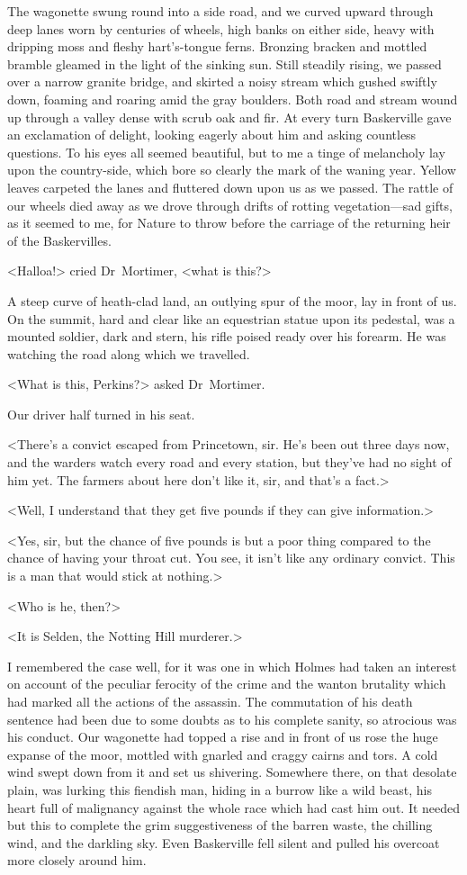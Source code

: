 The wagonette swung round into a side road, and we curved upward through deep lanes worn by centuries of wheels, high banks on either side, heavy with dripping moss and fleshy hart's-tongue ferns. Bronzing bracken and mottled bramble gleamed in the light of the sinking sun. Still steadily rising, we passed over a narrow granite bridge, and skirted a noisy stream which gushed swiftly down, foaming and roaring amid the gray boulders. Both road and stream wound up through a valley dense with scrub oak and fir. At every turn Baskerville gave an exclamation of delight, looking eagerly about him and asking countless questions. To his eyes all seemed beautiful, but to me a tinge of melancholy lay upon the country-side, which bore so clearly the mark of the waning year. Yellow leaves carpeted the lanes and fluttered down upon us as we passed. The rattle of our wheels died away as we drove through drifts of rotting vegetation—sad gifts, as it seemed to me, for Nature to throw before the carriage of the returning heir of the Baskervilles.

<Halloa!> cried Dr~Mortimer, <what is this?>

A steep curve of heath-clad land, an outlying spur of the moor, lay in front of us. On the summit, hard and clear like an equestrian statue upon its pedestal, was a mounted soldier, dark and stern, his rifle poised ready over his forearm. He was watching the road along which we travelled.

<What is this, Perkins?> asked Dr~Mortimer.

Our driver half turned in his seat.

<There's a convict escaped from Princetown, sir. He's been out three days now, and the warders watch every road and every station, but they've had no sight of him yet. The farmers about here don't like it, sir, and that's a fact.>

<Well, I understand that they get five pounds if they can give information.>

<Yes, sir, but the chance of five pounds is but a poor thing compared to the chance of having your throat cut. You see, it isn't like any ordinary convict. This is a man that would stick at nothing.>

<Who is he, then?>

<It is Selden, the Notting Hill murderer.>

I remembered the case well, for it was one in which Holmes had taken an interest on account of the peculiar ferocity of the crime and the wanton brutality which had marked all the actions of the assassin. The commutation of his death sentence had been due to some doubts as to his complete sanity, so atrocious was his conduct. Our wagonette had topped a rise and in front of us rose the huge expanse of the moor, mottled with gnarled and craggy cairns and tors. A cold wind swept down from it and set us shivering. Somewhere there, on that desolate plain, was lurking this fiendish man, hiding in a burrow like a wild beast, his heart full of malignancy against the whole race which had cast him out. It needed but this to complete the grim suggestiveness of the barren waste, the chilling wind, and the darkling sky. Even Baskerville fell silent and pulled his overcoat more closely around him.


